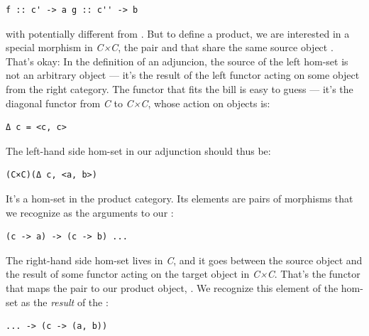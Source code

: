 \begin{verbatim}
f :: c' -> a g :: c'' -> b
\end{verbatim}
with  potentially different from
. But to define a product, we are interested in a
special morphism in \emph{C×C}, the pair  and  that
share the same source object . That's okay: In the definition
of an adjuncion, the source of the left hom-set is not an arbitrary
object --- it's the result of the left functor  acting on some
object from the right category. The functor that fits the bill is easy
to guess --- it's the diagonal functor from \emph{C} to \emph{C×C},
whose action on objects is:

\begin{verbatim}
Δ c = <c, c>
\end{verbatim}
The left-hand side hom-set in our adjunction should thus be:

\begin{verbatim}
(C×C)(Δ c, <a, b>)
\end{verbatim}
It's a hom-set in the product category. Its elements are pairs of
morphisms that we recognize as the arguments to our :

\begin{verbatim}
(c -> a) -> (c -> b) ...
\end{verbatim}
The right-hand side hom-set lives in \emph{C}, and it goes between the
source object  and the result of some functor 
acting on the target object in \emph{C×C}. That's the functor that maps
the pair  to our product object,
. We recognize this element of the hom-set as the
\emph{result} of the :

\begin{verbatim}
... -> (c -> (a, b))
\end{verbatim}

\begin{figure}[H]
\centering
{}
\end{figure}

